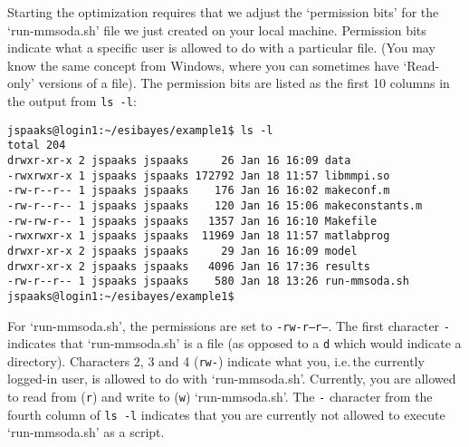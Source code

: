Starting the optimization requires that we adjust the `permission bits' for the `run-mmsoda.sh' file we just created on your local machine. Permission bits indicate what a specific user is allowed to do with a particular file. (You may know the same concept from Windows, where you can sometimes have `Read-only' versions of a file). The permission bits are listed as the first 10 columns in the output from \texttt{ls -l}:
\begin{lstlisting}[style=basic,style=bash]
jspaaks@login1:~/esibayes/example1$ ls -l
total 204
drwxr-xr-x 2 jspaaks jspaaks     26 Jan 16 16:09 data
-rwxrwxr-x 1 jspaaks jspaaks 172792 Jan 18 11:57 libmmpi.so
-rw-r--r-- 1 jspaaks jspaaks    176 Jan 16 16:02 makeconf.m
-rw-r--r-- 1 jspaaks jspaaks    120 Jan 16 15:06 makeconstants.m
-rw-rw-r-- 1 jspaaks jspaaks   1357 Jan 16 16:10 Makefile
-rwxrwxr-x 1 jspaaks jspaaks  11969 Jan 18 11:57 matlabprog
drwxr-xr-x 2 jspaaks jspaaks     29 Jan 16 16:09 model
drwxr-xr-x 2 jspaaks jspaaks   4096 Jan 16 17:36 results
-rw-r--r-- 1 jspaaks jspaaks    580 Jan 18 13:26 run-mmsoda.sh
jspaaks@login1:~/esibayes/example1$
\end{lstlisting}
For `run-mmsoda.sh', the permissions are set to \texttt{-rw-r--r--}. The first character \texttt{-} indicates that `run-mmsoda.sh' is a file (as opposed to a \texttt{d} which would indicate a directory). Characters 2, 3 and 4 (\texttt{rw-}) indicate what you, i.e.\,the currently logged-in user, is allowed to do with `run-mmsoda.sh'. Currently, you are allowed to read from (\texttt{r}) and write to (\texttt{w}) `run-mmsoda.sh'. The \texttt{-} character from the fourth column of \texttt{ls -l} indicates that you are currently not allowed to execute `run-mmsoda.sh' as a script.





